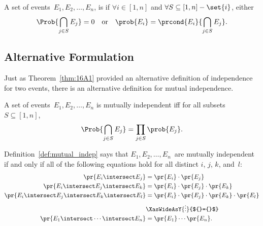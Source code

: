 \begin{definition}\label{def:mutual_independence}
A set of events~$E_1, E_2, \dots, E_n$, is 
if $\forall i \in [1, n]$ and $\forall S \subseteq [1, n] - \set{i}$,
either
\begin{equation*}
    \Prob{\bigcap_{j \in S} E_j} = 0
\quad
\text{or}
\quad
    \prob{E_i} = \prcond{E_i}{\bigcap_{j \in S} E_j}.
\end{equation*}
\end{definition}

\subsection{Alternative Formulation}

Just as Theorem~\ref{thm:16A1} provided an alternative definition of
independence for two events, there is an alternative definition for
mutual independence.

\fi


\begin{definition}\label{def:mutual_indep}
A set of events~$E_1, E_2, \dots, E_n$ is mutually independent iff
for all subsets $S \subseteq [1, n]$,
\begin{equation*}
    \Prob{\bigcap_{j \in S} E_j} = \prod_{j \in S} \prob{E_j}.
\end{equation*}
\end{definition}

\iffalse
The proof of Theorem~\ref{thm:16A2} uses induction and reasoning
similar to the proof of Theorem~\ref{thm:16A1}.  We will not include
the details here.
\fi

Definition~\ref{def:mutual_indep} says that $E_1, E_2, \dots, E_n$~are
mutually independent if and only if all of the following equations
hold for all distinct $i$, $j$, $k$, and~$l$:
%
\begin{align*}
\pr{E_i \intersect E_j}
    & = \pr{E_i} \cdot \pr{E_j}
 \\
\pr{E_i \intersect E_j \intersect E_k}
    & = \pr{E_i} \cdot \pr{E_j} \cdot \pr{E_k}
 \\
\pr{E_i \intersect E_j \intersect E_k \intersect E_l}
    & = \pr{E_i} \cdot \pr{E_j} \cdot \pr{E_k} \cdot \pr{E_l}
 \\
    & \XasWideAsY{\vdots}{${}={}$} \\
\pr{E_1 \intersect \cdots \intersect E_n} & = \pr{E_1} \cdots \pr{E_n}.
\end{align*}

